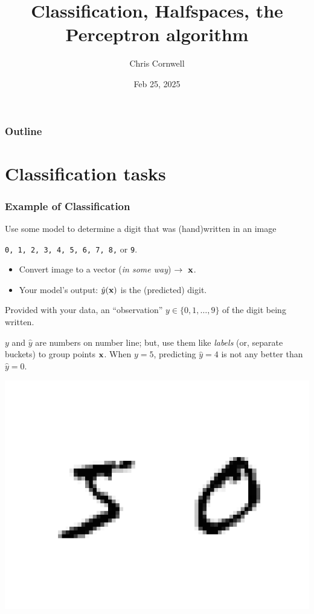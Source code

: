 \documentclass{beamer}
\author{Chris Cornwell}
\date{Feb 25, 2025}
\title{Classification, Halfspaces, the Perceptron algorithm}
\theoremstyle{example}
\newcommand{\ttt}[1]{{\small\texttt{#1}}}
\begin{document}
\begin{frame}
\titlepage
\end{frame}

\begin{frame}
\frametitle{Outline}
\tableofcontents
\end{frame}

\section{Classification tasks}

\begin{frame}
\frametitle{Example of Classification}
Use some model to determine a digit that was (hand)written in an image
    \begin{center}\ttt{0, 1, 2, 3, 4, 5, 6, 7, 8,} or \ttt{9}.\end{center}

\pause
\begin{itemize}
    \item Convert image to a vector (\textit{in some way}) $\to\ {\bf x}$.
    \item Your model's output: $\hat{y}({\bf x})$ is the (predicted) digit. 
\end{itemize}

Provided with your data, an ``observation'' $y\in\{0,1,\ldots,9\}$ of the digit being written. 

\pause 
$y$ and $\hat{y}$ are numbers on number line; but, use them like \emph{labels} (or, separate buckets) to group points ${\bf x}$. When $y=5$, predicting $\hat{y} = 4$ is not any better than $\hat{y} = 0$.

\centering
\includegraphics[height=0.25\textheight]{../../Images/50.png}
\end{frame}
\end{document}
